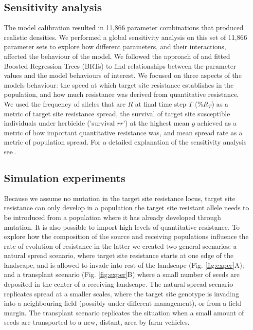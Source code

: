 \documentclass[10pt,letterpaper]{article}
\begin{document}
\subsection*{Sensitivity analysis}
The model calibration resulted in 11,866 parameter combinations that produced realistic densities. We performed a global sensitivity analysis on this set of 11,866 parameter sets to explore how different parameters, and their interactions, affected the behaviour of the model. We followed the approach of \cite{Cout2014} and fitted Boosted Regression Trees (BRTs) to find relationships between the parameter values and the model behaviours of interest. We focused on three aspects of the models behaviour: the speed at which target site resistance establishes in the population, and how much resistance was derived from quantitative resistance. We used the frequency of alleles that are $R$ at final time step $T$ (\%$R_T$) as a metric of target site resistance spread, the survival of target site susceptible individuals under herbicide ('survival $rr$') at the highest mean $g$ achieved as a metric of how important quantitative resistance was, and mean spread rate as a metric of population spread. For a detailed explanation of the sensitivity analysis see .

\subsection*{Simulation experiments}
Because we assume no mutation in the target site resistance locus, target site resistance can only develop in a population the target site resistant allele needs to be introduced from a population where it has already developed through mutation. It is also possible to import high levels of quantitative resistance. To explore how the composition of the source and receiving populations influence the rate of evolution of resistance in the latter we created two general scenarios: a natural spread scenario, where target site resistance starts at one edge of the landscape, and is allowed to invade into rest of the landscape (Fig. \ref{fig:exper}A); and a transplant scenario (Fig. \ref{fig:exper}B) where a small number of seeds are deposited in the center of a receiving landscape. The natural spread scenario replicates spread at a smaller scales, where the target site genotype is invading into a neighbouring field (possibly under different management), or from a field margin. The transplant scenario replicates the situation when a small amount of seeds are transported to a new, distant, area by farm vehicles. 
\end{document}

